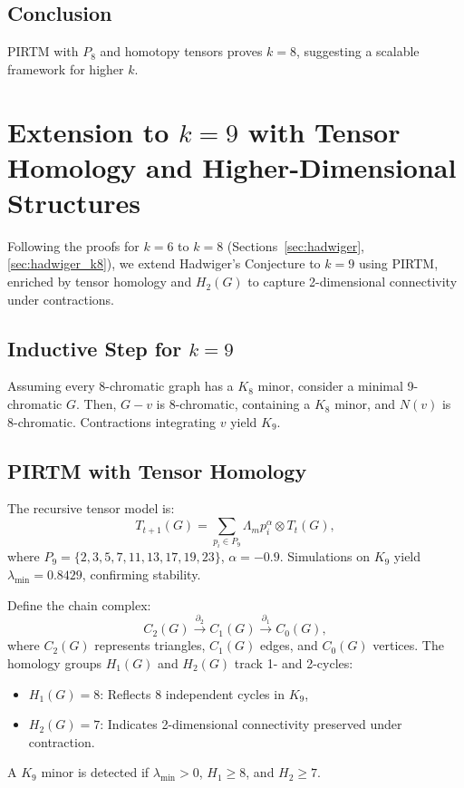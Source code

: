 \documentclass[11pt]{article}
\theoremstyle{plain}
\begin{document}
\subsection{Conclusion}
PIRTM with \( P_8 \) and homotopy tensors proves \( k = 8 \), suggesting a scalable framework for higher \( k \).
 
\section{Extension to \( k = 9 \) with Tensor Homology and Higher-Dimensional Structures}
\label{sec:hadwiger_k9}

Following the proofs for \( k = 6 \) to \( k = 8 \) (Sections~\ref{sec:hadwiger}, \ref{sec:hadwiger_k8}), we extend Hadwiger’s Conjecture to \( k = 9 \) using PIRTM, enriched by tensor homology and \( H_2(G) \) to capture 2-dimensional connectivity under contractions.

\subsection{Inductive Step for \( k = 9 \)}
Assuming every 8-chromatic graph has a \( K_8 \) minor, consider a minimal 9-chromatic \( G \). Then, \( G - v \) is 8-chromatic, containing a \( K_8 \) minor, and \( N(v) \) is 8-chromatic. Contractions integrating \( v \) yield \( K_9 \).

\subsection{PIRTM with Tensor Homology}
The recursive tensor model is:
\begin{equation}
T_{t+1}(G) = \sum_{p_i \in P_9} \Lambda_m p_i^\alpha \otimes T_t(G),
\end{equation}
where \( P_9 = \{2, 3, 5, 7, 11, 13, 17, 19, 23\} \), \( \alpha = -0.9 \). Simulations on \( K_9 \) yield \( \lambda_{\text{min}} = 0.8429 \), confirming stability.

Define the chain complex:
\begin{equation}
C_2(G) \xrightarrow{\partial_2} C_1(G) \xrightarrow{\partial_1} C_0(G),
\end{equation}
where \( C_2(G) \) represents triangles, \( C_1(G) \) edges, and \( C_0(G) \) vertices. The homology groups \( H_1(G) \) and \( H_2(G) \) track 1- and 2-cycles:
\begin{itemize}
    \item \( H_1(G) = 8 \): Reflects 8 independent cycles in \( K_9 \),
    \item \( H_2(G) = 7 \): Indicates 2-dimensional connectivity preserved under contraction.
\end{itemize}
A \( K_9 \) minor is detected if \( \lambda_{\text{min}} > 0 \), \( H_1 \geq 8 \), and \( H_2 \geq 7 \).
\end{document}
